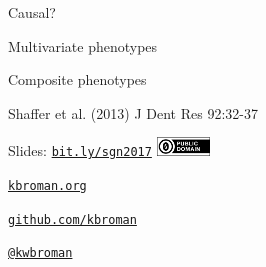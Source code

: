 \documentclass[12pt,t]{beamer}
\begin{document}
\begin{frame}[c]{Causal?}
\end{frame}



\begin{frame}[c]{Multivariate phenotypes}
\end{frame}



\begin{frame}{Composite phenotypes}

\vspace{7mm}


\vspace{7mm}

\hfill {\scriptsize \color{lolit} Shaffer et al. (2013) J Dent Res 92:32-37}

\end{frame}




\begin{frame}[c]{}

\Large

Slides: \href{http://bit.ly/sgn2017}{\tt bit.ly/sgn2017} \quad
\includegraphics[height=5mm]{Figs/cc-zero.png}

\vspace{7mm}

\href{http://kbroman.org}{\tt \lolit kbroman.org}

\vspace{7mm}

\href{https://github.com/kbroman}{\tt \lolit github.com/kbroman}

\vspace{7mm}

\href{https://twitter.com/kwbroman}{\tt \lolit @kwbroman}


\end{frame}
\end{document}
